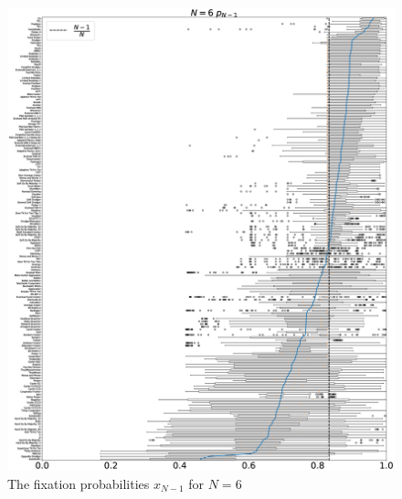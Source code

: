 \documentclass[10pt,letterpaper]{article}
\begin{document}
\begin{figure}[!hbtp]
    \centering
    \includegraphics[draft, width=\textwidth]{./Fig28.eps}
    \caption{The fixation probabilities \(x_{N-1}\) for \(N=6\)}
\end{figure}
\end{document}
